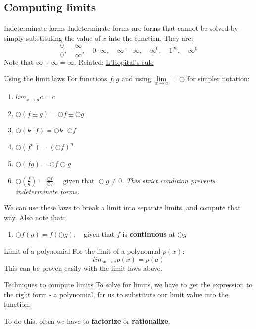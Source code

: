 \subsection{Computing limits}
\label{sec:indeterminate}
\begin{definition}
    {Indeterminate forms}
    Indeterminate forms are forms that cannot be solved by simply substituting the value of $x$ into the function. They are:
    \[\frac{0}{0},\quad\frac{\infty}{\infty},\quad0\cdot\infty,\quad\infty-\infty,\quad\infty^0,\quad1^\infty,\quad\infty^0\]
    Note that $\infty + \infty = \infty$. Related: \hyperref[sec:lhr]{L'Hopital's rule}
\end{definition}
\begin{theorem}
    {Using the limit laws}
    For functions $f,g$ and using $\mathop {\lim }\limits_{x \to a}=\bigcirc$ for simpler notation:
    \begin{enumerate}
        \item $lim_{x\to a}c=c$
        \item $\bigcirc(f\pm g)=\bigcirc f\pm \bigcirc g$
        \item $\bigcirc(k\cdot f)=\bigcirc k\cdot\bigcirc f$
        \item $\bigcirc(f^n)=(\bigcirc f)^n$
        \item $\bigcirc(fg)=\bigcirc f\bigcirc g$
        \item $\bigcirc(\frac{f}{g})=\frac{\bigcirc f}{\bigcirc g},\quad\text{given that }\bigcirc g\ne 0$. \emph{This strict condition prevents indeterminate forms.}
    \end{enumerate}
    We can use these laws to break a limit into separate limits, and compute that way. Also note that:
    \begin{enumerate}[start=7]
        \item $\bigcirc f(g)=f(\bigcirc g),\quad$given that $f$ is \textbf{continuous} at $\bigcirc g$
    \end{enumerate}
\end{theorem}
\begin{theorem}
    {Limit of a polynomial}
    For the limit of a polynomial $p(x)$:
    \[lim_{x\to a}p(x)=p(a)\]
    This can be proven easily with the limit laws above.
\end{theorem}
\begin{knBox}
    {Techniques to compute limits}
    To solve for limits, we have to get the expression to the right form - a polynomial, for us to substitute our limit value into the function.

    To do this, often we have to \textbf{factorize} or \textbf{rationalize}.
\end{knBox}
